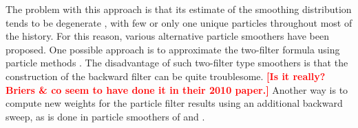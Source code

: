 \documentclass[twocolumn]{autart}    %
\newcommand{\comment}[1]{\textcolor{red}{\textbf{[#1]}}}
\begin{document}
%
The problem with this approach is that its estimate of the smoothing distribution tends to be degenerate \cite{Kitagawa:1996}, with few or only one unique particles throughout most of the history. For this reason, various alternative particle smoothers have been proposed. One possible approach is to approximate the two-filter formula using particle methods \cite{Kitagawa:1996,Briers+Doucet+Maskell:2010,Fearnhead:2010}. The disadvantage of such two-filter type smoothers is that the construction of the backward filter can be quite troublesome. \comment{Is it really? Briers \& co seem to have done it in their 2010 paper.} Another way is to compute new weights for the particle filter results using an additional backward sweep, as is done in particle smoothers of \cite{Hurzeler+Kunsch:1998} and \cite{Doucet+Godsill+Andrieu:2000}.
\end{document}
